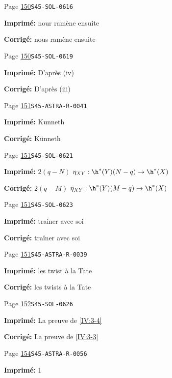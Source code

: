 \begin{description}
\smallskip
\item[\hypertarget{apparatus:FR-0116}{116}] Page \hyperlink{printpage:fr:150}{150}\quad\texttt{S45-SOL-0616}
\par\noindent\textbf{Imprimé:} nour ramène ensuite
\par\noindent\textbf{Corrigé:} nous ramène ensuite
\smallskip
\item[\hypertarget{apparatus:FR-0117}{117}] Page \hyperlink{printpage:fr:150}{150}\quad\texttt{S45-SOL-0619}
\par\noindent\textbf{Imprimé:} D'après (iv)
\par\noindent\textbf{Corrigé:} D'après (iii)
\smallskip
\item[\hypertarget{apparatus:FR-0118}{118}] Page \hyperlink{printpage:fr:151}{151}\quad\texttt{S45-ASTRA-R-0041}
\par\noindent\textbf{Imprimé:} Kunneth
\par\noindent\textbf{Corrigé:} K\"unneth
\smallskip
\item[\hypertarget{apparatus:FR-0119}{119}] Page \hyperlink{printpage:fr:151}{151}\quad\texttt{S45-SOL-0621}
\par\noindent\textbf{Imprimé:} $2(q-N)$ $\eta_{XY}:\h^*(Y)(N-q)\to \h^*(X)$
\par\noindent\textbf{Corrigé:} $2(q-M)$ $\eta_{XY}:\h^*(Y)(M-q)\to \h^*(X)$
\smallskip
\item[\hypertarget{apparatus:FR-0120}{120}] Page \hyperlink{printpage:fr:151}{151}\quad\texttt{S45-SOL-0623}
\par\noindent\textbf{Imprimé:} trainer avec soi
\par\noindent\textbf{Corrigé:} traîner avec soi
\smallskip
\item[\hypertarget{apparatus:FR-0121}{121}] Page \hyperlink{printpage:fr:151}{151}\quad\texttt{S45-ASTRA-R-0039}
\par\noindent\textbf{Imprimé:} les twist à la Tate
\par\noindent\textbf{Corrigé:} les twists à la Tate
\smallskip
\item[\hypertarget{apparatus:FR-0122}{122}] Page \hyperlink{printpage:fr:152}{152}\quad\texttt{S45-SOL-0626}
\par\noindent\textbf{Imprimé:} La preuve de \ref{IV:3-4}
\par\noindent\textbf{Corrigé:} La preuve de \ref{IV:3-3}
\smallskip
\item[\hypertarget{apparatus:FR-0123}{123}] Page \hyperlink{printpage:fr:154}{154}\quad\texttt{S45-ASTRA-R-0056}
\par\noindent\textbf{Imprimé:} 1

\end{description}
